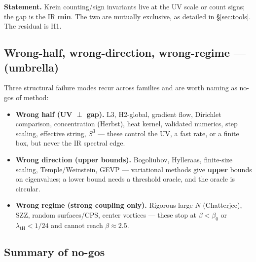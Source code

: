 \textbf{Statement.} Krein counting/sign invariants live at the UV scale or count signs; the gap is
the IR \textbf{min}. The two are mutually exclusive, as detailed in \S\ref{sec:tools}. The
residual is H1.

\subsection{Wrong-half, wrong-direction, wrong-regime --- \LN{} (umbrella)}

Three structural failure modes recur across families and are worth naming as no-gos of method:

\begin{itemize}
\item \textbf{Wrong half (UV $\perp$ gap).} L3, H2-global, gradient flow, Dirichlet comparison,
  concentration (Herbst), heat kernel, validated numerics, step scaling, effective string,
  $S^3$ --- these control the UV, a fast rate, or a finite box, but never the IR spectral edge.
\item \textbf{Wrong direction (upper bounds).} Bogoliubov, Hylleraas, finite-size scaling,
  Temple/Weinstein, GEVP --- variational methods give \textbf{upper} bounds on eigenvalues; a
  lower bound needs a threshold oracle, and the oracle is circular.
\item \textbf{Wrong regime (strong coupling only).} Rigorous large-$N$ (Chatterjee), SZZ, random
  surfaces/CPS, center vortices --- these stop at $\beta<\beta_0$ or $\lambda_{\mathrm{tH}}<1/24$ and cannot
  reach $\beta\approx2.5$.
\end{itemize}

\subsection{Summary of no-gos}

